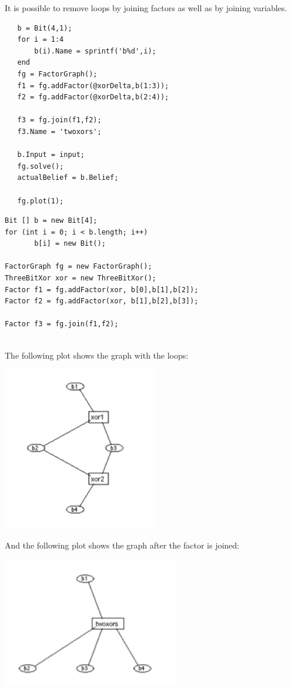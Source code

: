 
It is possible to remove loops by joining factors as well as by joining variables.

\ifmatlab
\begin{lstlisting}
   b = Bit(4,1);
   for i = 1:4
       b(i).Name = sprintf('b%d',i);
   end
   fg = FactorGraph();
   f1 = fg.addFactor(@xorDelta,b(1:3));
   f2 = fg.addFactor(@xorDelta,b(2:4));
   
   f3 = fg.join(f1,f2);
   f3.Name = 'twoxors';
   
   b.Input = input;
   fg.solve();
   actualBelief = b.Belief;
   
   fg.plot(1);
\end{lstlisting}
\fi

\ifjava
\begin{lstlisting}
Bit [] b = new Bit[4];
for (int i = 0; i < b.length; i++)
	   b[i] = new Bit();
		   
FactorGraph fg = new FactorGraph();
ThreeBitXor xor = new ThreeBitXor();
Factor f1 = fg.addFactor(xor, b[0],b[1],b[2]);
Factor f2 = fg.addFactor(xor, b[1],b[2],b[3]);
		   
Factor f3 = fg.join(f1,f2);
		   
\end{lstlisting}
\fi

The following plot shows the graph with the loops:  
 
\includegraphics{images/LoopyGraph2.png}

And the following plot shows the graph after the factor is joined: 
 
\includegraphics{images/NonLoopyGraph2.png}

